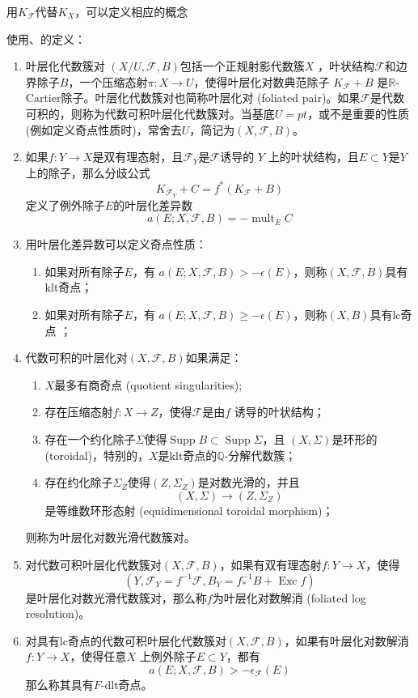 用$K_{\mathcal{F}}$代替$K_{X}$，可以定义相应的概念
\begin{definition}
使用\cite[3.4.5,6.2.1]{chlx}、\cite[3.2]{acss}的定义：
  \begin{enumerate}
    \item 叶层化代数簇对 $(X/U,\mathcal{F},B)$包括一个正规射影代数簇$X$ ，叶状结构$\mathcal{F}$和边界除子$B$，一个压缩态射$\pi:X\to U$，使得叶层化对数典范除子 $ K_{\mathcal{F}}+B $ 是$\mathbb{R}$-Cartier除子。叶层化代数簇对也简称叶层化对 (foliated pair)。如果$\mathcal{F}$是代数可积的，则称为代数可积叶层化代数簇对。当基底$U=pt$，或不是重要的性质 (例如定义奇点性质时)，常舍去$U$，简记为$(X,\mathcal{F},B)$。 
    \item 如果$f:Y\to X$是双有理态射，且$\mathcal{F}_{Y} $是$\mathcal{F} $诱导的 $Y$ 上的叶状结构，且$E \subset Y$是$Y$ 上的除子，那么分歧公式
  \[ K_{\mathcal{F}_{Y}}+C=f^{*}(K_{\mathcal{F}}+B) \]
  定义了例外除子$E$的叶层化差异数
  \[ a(E;X,\mathcal{F},B)=- \operatorname{mult}_{E}C \]
    \item 用叶层化差异数可以定义奇点性质：
      \begin{enumerate}
        \item 如果对所有除子$E$，有 $a(E;X,\mathcal{F},B)>-\epsilon(E)$，则称$(X,\mathcal{F},B) $具有klt奇点；
        \item 如果对所有除子$E$，有 $a(E;X,\mathcal{F},B)\geqslant -\epsilon(E)$，则称$(X,B) $具有lc奇点 ；
      \end{enumerate}
    \item 代数可积的叶层化对$(X,\mathcal{F},B)$如果满足：
      \begin{enumerate}
        \item $X$最多有商奇点 (quotient singularities);
        \item 存在压缩态射$f:X\to Z$，使得$\mathcal{F}$是由$f$ 诱导的叶状结构； 
        \item 存在一个约化除子$\Sigma$使得$\operatorname{Supp}B \subset \operatorname{Supp} \Sigma $，且 $(X,\Sigma)$是环形的 (toroidal)，特别的，$X$是klt奇点的$\mathbb{Q}$-分解代数簇；
        \item 存在约化除子$\Sigma_{Z}$使得$ (Z,\Sigma_{Z})$是对数光滑的，并且
          \[ (X,\Sigma)\to (Z,\Sigma_{Z}) \]
          是等维数环形态射 (equidimensional toroidal morphism)；
      \end{enumerate}
      则称为叶层化对数光滑代数簇对。
    \item 对代数可积叶层化代数簇对$(X,\mathcal{F},B)$，如果有双有理态射$f:Y\to X$，使得
      \[ (Y,\mathcal{F}_{Y}=f^{-1}\mathcal{F},B_{Y}=f^{-1}_{*}B+ \operatorname{Exc}f) \]
      是叶层化对数光滑代数簇对，那么称$f$为叶层化对数解消 (foliated log resolution)。
    \item 对具有lc奇点的代数可积叶层化代数簇对$(X,\mathcal{F},B)$，如果有叶层化对数解消$f:Y\to X$，使得任意$X$ 上例外除子$E \subset Y$，都有
      \[ a(E;X,\mathcal{F},B)>-\epsilon_{\mathcal{F}}(E) \]
      那么称其具有$F$-dlt奇点。
  \end{enumerate}
\end{definition}
